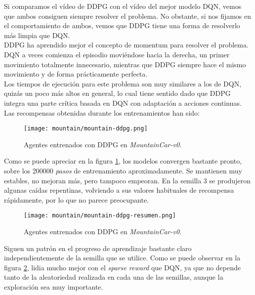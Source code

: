 \documentclass[11pt,fleqn]{book} %
\begin{document}
Si comparamos el vídeo de DDPG con el vídeo del mejor modelo DQN, vemos que ambos consiguen siempre resolver el problema. No obstante, si nos fijamos en el comportamiento de ambos, vemos que DDPG tiene una forma de resolverlo más limpia que DQN. \\

DDPG ha aprendido mejor el concepto de momentum para resolver el problema. DQN a veces comienza el episodio moviéndose hacia la derecha, un primer movimiento totalmente innecesario, mientras que DDPG siempre hace el mismo movimiento y de forma prácticamente perfecta.\\

Los tiempos de ejecución para este problema son muy similares a los de DQN, quizás un poco más altos en general, lo cual tiene sentido dado que DDPG integra una parte crítica basada en DQN con adaptación a acciones continuas. Las recompensas obtenidas durante los entrenamientos han sido:

\begin{figure}[H]
	\centering\texttt{[image: mountain/mountain-ddpg.png]}
	\caption{Agentes entrenados con DDPG en \textit{MountainCar-v0}.}
	\label{fig:mountainDDPG} %
\end{figure} 

Como se puede apreciar en la figura \ref{fig:mountainDDPG}, los modelos convergen bastante pronto, sobre los 200000 \textit{pasos} de entrenamiento aproximadamente. Se mantienen muy estables, no mejoran más, pero tampoco empeoran. En la semilla 3 se produjeron algunas caídas repentinas, volviendo a sus valores habituales de recompensa rápidamente, por lo que no parece preocupante.

\begin{figure}[H]
	\centering\texttt{[image: mountain/mountain-ddpg-resumen.png]}
	\caption{Agentes entrenados con DDPG en \textit{MountainCar-v0}.}
	\label{fig:mountainDDPGresumen} %
\end{figure}

Siguen un patrón en el progreso de aprendizaje bastante claro independientemente de la semilla que se utilice. Como se puede observar en la figura \ref{fig:mountainDDPGresumen}, lidia mucho mejor con el \textit{sparse reward} que DQN, ya que no depende tanto de la aleatoriedad realizada en cada una de las semillas, aunque la exploración sea muy importante. \\
\end{document}
